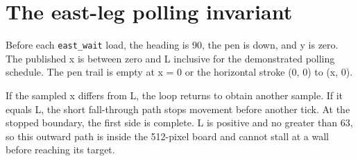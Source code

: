 \section{The east-leg polling
  invariant}\label{006-marsbot-square-x-invariant-the-east-leg-polling-invariant}

Before each \texttt{east\_wait} load, the heading is 90, the pen is
down, and y is zero. The published x is between zero and L inclusive for
the demonstrated polling schedule. The pen trail is empty at x = 0 or
the horizontal stroke (0, 0) to (x, 0).

If the sampled x differs from L, the loop returns to obtain another
sample. If it equals L, the short fall-through path stops movement
before another tick. At the stopped boundary, the first side is
complete. L is positive and no greater than 63, so this outward path is
inside the 512-pixel board and cannot stall at a wall before reaching
its target.
